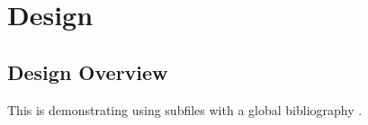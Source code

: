 \documentclass[../dissertation.tex]{subfiles}
\begin{document}

\section{Design} \label{sec:proto:design}

\subsection{Design Overview} \label{sec:proto:overview}

This is demonstrating using subfiles with a global bibliography \citep{Davison2020}.

\biblio
\end{document}
